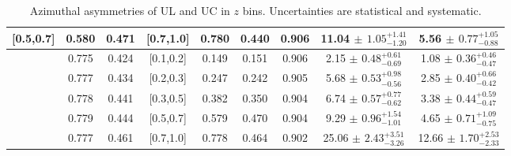 \begin{table}[H]
\begin{tabular}{|c|c|c|c|c|c|c|c|c|}
[0.5,0.7]	&	0.580	&	0.471	&	[0.7,1.0]	&	0.780	&	0.440	&	0.906	&	11.04	$\pm$ $	1.05	_{	-1.20	}^{+	1.41	}$&	5.56	$\pm$ $	0.77	_{	-0.88	}^{+	1.05	}$\\ \hline
[0.7,1.0]	&	0.775	&	0.424	&	[0.1,0.2]	&	0.149	&	0.151	&	0.906	&	2.15	$\pm$ $	0.48	_{	-0.69	}^{+	0.61	}$&	1.08	$\pm$ $	0.36	_{	-0.47	}^{+	0.46	}$\\ \hline
[0.7,1.0]	&	0.777	&	0.434	&	[0.2,0.3]	&	0.247	&	0.242	&	0.905	&	5.68	$\pm$ $	0.53	_{	-0.56	}^{+	0.98	}$&	2.85	$\pm$ $	0.40	_{	-0.42	}^{+	0.66	}$\\ \hline
[0.7,1.0]	&	0.778	&	0.441	&	[0.3,0.5]	&	0.382	&	0.350	&	0.904	&	6.74	$\pm$ $	0.57	_{	-0.62	}^{+	0.77	}$&	3.38	$\pm$ $	0.44	_{	-0.47	}^{+	0.59	}$\\ \hline
[0.7,1.0]	&	0.779	&	0.444	&	[0.5,0.7]	&	0.579	&	0.470	&	0.904	&	9.29	$\pm$ $	0.96	_{	-1.01	}^{+	1.54	}$&	4.65	$\pm$ $	0.71	_{	-0.75	}^{+	1.09	}$\\ \hline
[0.7,1.0]	&	0.777	&	0.461	&	[0.7,1.0]	&	0.778	&	0.464	&	0.902	&	25.06	$\pm$ $	2.43	_{	-3.26	}^{+	3.51	}$&	12.66	$\pm$ $	1.70	_{	-2.33	}^{+	2.53	}$\\ \hline
\end{tabular}
\caption{Azimuthal asymmetries of UL and UC in $z$ bins. Uncertainties are statistical and systematic.}
\label{tab:finaluluczbin}
\end{table} 

